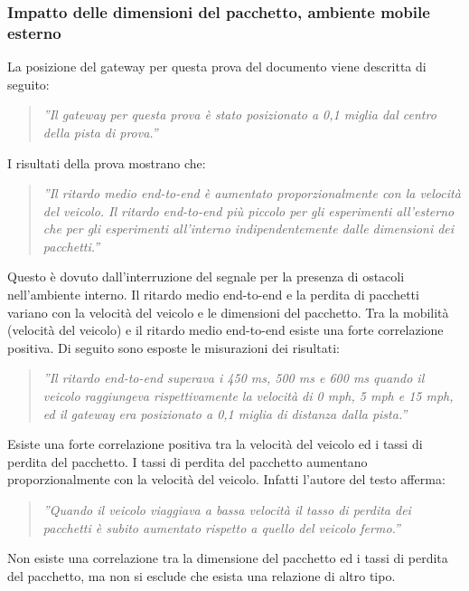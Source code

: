 \documentclass[a4paper]{report} %
\begin{document}
\subsubsection{Impatto delle dimensioni del pacchetto, ambiente mobile esterno}
La posizione del gateway per questa prova del documento \cite{art:rif.47} viene descritta di seguito:
\begin{quote}
	\textit{''Il gateway per questa prova è stato posizionato a 0,1 miglia dal centro della pista di prova.''}
\end{quote}
I risultati della prova mostrano che:
\begin{quote}
	\textit{''Il ritardo medio end-to-end è aumentato proporzionalmente con la velocità del veicolo. 
	Il ritardo end-to-end più piccolo per gli esperimenti all'esterno che per gli esperimenti all'interno indipendentemente dalle dimensioni dei pacchetti.''} 
\end{quote}
Questo è dovuto dall'interruzione del segnale per la presenza di ostacoli nell'ambiente interno. Il ritardo medio end-to-end e la perdita di pacchetti variano con la velocità del veicolo e le dimensioni del pacchetto. Tra la mobilità (velocità del veicolo) e il ritardo medio end-to-end esiste una forte correlazione positiva. Di seguito sono esposte le misurazioni dei risultati:
\begin{quote}
	\textit{''Il ritardo end-to-end superava i 450 ms, 500 ms e 600 ms quando il veicolo raggiungeva rispettivamente la velocità di 0 mph, 5 mph e 15 mph, ed il gateway era posizionato a 0,1 miglia di distanza dalla pista.''}
\end{quote}
Esiste una forte correlazione positiva tra la velocità del veicolo ed i tassi di perdita del pacchetto. I tassi di perdita del pacchetto aumentano proporzionalmente con la velocità del veicolo. Infatti l'autore del testo \cite{art:rif.47} afferma:
\begin{quote}
	\textit{''Quando il veicolo viaggiava a bassa velocità il tasso di perdita dei pacchetti è subito aumentato rispetto a quello del veicolo fermo.''}
\end{quote}
Non esiste una correlazione tra la dimensione del pacchetto ed i tassi di perdita del pacchetto, ma non si esclude che esista una relazione di altro tipo.
\end{document}
